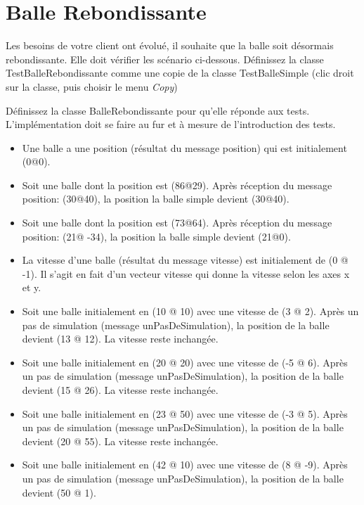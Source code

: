 \documentclass[12pt]{article}
\begin{document}
\section{Balle Rebondissante}
Les besoins de votre client ont évolué, il souhaite que la balle soit désormais rebondissante. 
Elle doit vérifier les scénario ci-dessous.
Définissez la classe {\sf TestBalleRebondissante} comme une copie de la classe {\sf TestBalleSimple} (clic droit sur la classe, puis choisir le menu \emph{Copy}) 

Définissez la classe {\sf BalleRebondissante} pour qu'elle réponde aux tests.
L'implémentation doit se faire au fur et à mesure de l'introduction des tests.


\begin{itemize}
	\item Une balle a une position (résultat du message {\sf position}) qui est initialement {\sf (0@0)}.
	\item Soit une balle dont la position est {\sf (86@29)}. 
	Après réception du message {\sf position: (30@40)}, la position la balle simple devient {\sf (30@40)}.
	\item Soit une balle dont la position est {\sf (73@64)}. 
	Après réception du message {\sf position: (21@ -34)}, la position la balle simple devient {\sf (21@0)}.
	\item La vitesse d'une balle (résultat du message {\sf vitesse}) est initialement de {\sf (0 @ -1)}. Il s'agit en fait d'un vecteur vitesse qui donne la vitesse selon les axes x et y.
	\item Soit une balle initialement en {\sf (10 @ 10)} avec une vitesse de {\sf (3 @ 2)}. 
	Après un pas de simulation (message {\sf unPasDeSimulation}), la position de la balle devient  {\sf (13 @ 12)}. 
	La vitesse reste inchangée.
	\item Soit une balle initialement en {\sf (20 @ 20)} avec une vitesse de {\sf (-5 @ 6)}. 
	Après un pas de simulation (message {\sf unPasDeSimulation}), la position de la balle devient  {\sf (15 @ 26)}. 
	La vitesse reste inchangée.
	\item Soit une balle initialement en {\sf (23 @ 50)} avec une vitesse de {\sf (-3 @ 5)}. 
	Après un pas de simulation (message {\sf unPasDeSimulation}), la position de la balle devient  {\sf (20 @ 55)}. 
	La vitesse reste inchangée.
	\item Soit une balle initialement en {\sf (42 @ 10)} avec une vitesse de {\sf (8 @ -9)}. 
	Après un pas de simulation (message {\sf unPasDeSimulation}), la position de la balle devient  {\sf (50 @ 1)}. 

\end{itemize}
\end{document}
